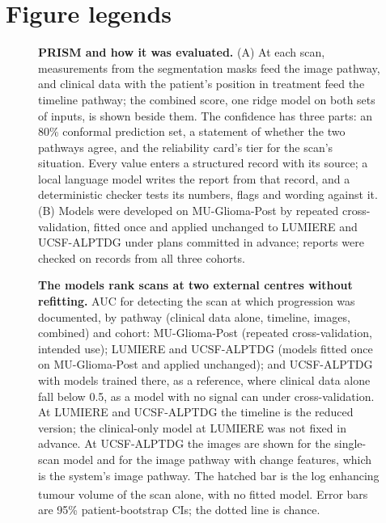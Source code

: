 \documentclass[largeformat]{interact} %
\newcommand{\expl}{\textsuperscript{\textdagger}}
\begin{document}
\clearpage
\section*{Figure legends}

\begin{figure}[!htbp]
\centering
{}
\caption{\textbf{PRISM and how it was evaluated.} (A) At each scan, measurements from the segmentation masks feed
the image pathway, and clinical data with the patient's position in treatment feed the timeline pathway; the
combined score, one ridge model on both sets of inputs, is shown beside them. The confidence has three parts: an
80\% conformal prediction set, a statement of whether the two pathways agree, and the reliability card's tier for
the scan's situation. Every value enters a structured record with its source; a local language model writes the
report from that record, and a deterministic checker tests its numbers, flags and wording against it. (B) Models
were developed on MU-Glioma-Post by repeated cross-validation, fitted once and applied unchanged to LUMIERE and
UCSF-ALPTDG under plans committed in advance; reports were checked on records from all three cohorts.}
\label{fig:1}
\end{figure}

\begin{figure}[!htbp]
\centering
{}
\caption{\textbf{The models rank scans at two external centres without refitting.} AUC for detecting the scan at which
progression was documented, by pathway (clinical data alone, timeline, images, combined) and cohort: MU-Glioma-Post
(repeated cross-validation, intended use); LUMIERE and UCSF-ALPTDG (models fitted once on MU-Glioma-Post and applied
unchanged); and UCSF-ALPTDG with models trained there, as a reference, where clinical data alone fall below 0.5, as a model with
no signal can under cross-validation. At LUMIERE and UCSF-ALPTDG the timeline is the
reduced version; the clinical-only model at LUMIERE was not fixed in advance. At UCSF-ALPTDG the images are shown for the
single-scan model and for the image pathway with change features, which is the system's image pathway. The hatched bar
is the log enhancing tumour volume of the scan alone, with no fitted model\expl. Error bars are 95\% patient-bootstrap
CIs; the dotted line is chance.}
\label{fig:2}
\end{figure}
\end{document}
